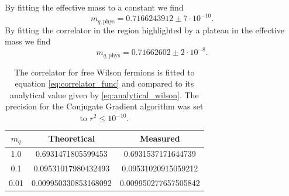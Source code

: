 By fitting the effective mass to a constant we find 
\begin{equation*}
    m_{q, \text{phys}} = 0.7166243912 \pm 7 \cdot 10^{-10}.
\end{equation*}
By fitting the correlator in the region highlighted by a plateau in the effective mass we find
\begin{equation*}
    m_{q, \text{phys}} = 0.71662602 \pm 2 \cdot 10^{-8}.
\end{equation*}
\newpage
\vfill
\begin{table}[h!]
    \centering
    \begin{tabular}[pos]{ccc}
        \toprule
        $m_q$ & Theoretical & Measured \\
        \midrule 
        1.0 & 0.6931471805599453 & 0.6931537171644739 \\
        0.1 & 0.09531017980432493 & 0.09531020915059212 \\
        0.01 & 0.009950330853168092 & 0.009950277657505842 \\
        \bottomrule
    \end{tabular}
    \caption[Fit of the correlator for free Wilson fermions.]{The correlator for free Wilson fermions is fitted to equation \eqref{eq:correlator_func} and compared to its analytical value given by \eqref{eq:analytical_wilson}. The precision for the Conjugate Gradient algorithm was set to $r^2 \leq 10^{-10}$.}
    \label{tab:free_wilson_fit}
\end{table}
\vfill
